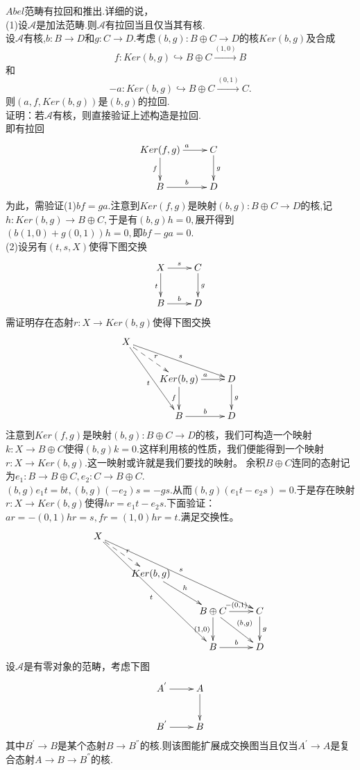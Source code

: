 \documentclass[UTF8]{article}
\begin{document}
$Abel$范畴有拉回和推出.详细的说，\\
(1)设$\mathcal{A}$是加法范畴.则$\mathcal{A}$有拉回当且仅当其有核.\\
设$\mathcal{A}$有核,$b:B\longrightarrow D$和$g:C\longrightarrow D.$考虑$(b,g):B\oplus C\longrightarrow D$的核$Ker(b,g)$及合成
$$
f:Ker(b,g)\hookrightarrow B\oplus C\stackrel{(1,0)}{\longrightarrow}B
$$
和$$
-a:Ker(b,g)\hookrightarrow B\oplus C\stackrel{(0,1)}{\longrightarrow}C.
$$
则$(a,f,Ker(b,g))$是$(b,g)$的拉回.\\
证明：若$\mathcal{A}$有核，则直接验证上述构造是拉回.\\
即有拉回$$
\xymatrix{Ker(f,g)\ar[r]^{a}\ar[d]_{f} &C\ar[d]^{g}\\
	B\ar[r]^{b}&D   }
$$
为此，需验证(1)$bf=ga.$注意到$Ker(f,g)$是映射$(b,g):B\oplus C\longrightarrow D$的核,记$h:Ker(b,g)\longrightarrow B\oplus C,$于是有$(b,g)h=0,$展开得到$(b(1,0)+g(0,1))h=0,$即$bf-ga=0.$\\
(2)设另有$(t,s,X)$使得下图交换
$$
\xymatrix{X\ar[r]^{s}\ar[d]_{t} &C\ar[d]^{g}\\
	B\ar[r]^{b}&D   }
$$
需证明存在态射$r:X\longrightarrow Ker(b,g)$使得下图交换
$$
\xymatrix{X\ar@{-->}[dr]^{r}\ar[rrd]^{s}\ar[ddr]_{t}\\
   &Ker(b,g)\ar[r]^{a}\ar[d]_{f}&D\ar[d]^{g}\\
&B\ar[r]^{b}&D   }
$$
注意到$Ker(f,g)$是映射$(b,g):B\oplus C\longrightarrow D$的核，我们可构造一个映射$k:X\longrightarrow B\oplus C$使得$(b,g)k=0.$这样利用核的性质，我们便能得到一个映射$r:X\longrightarrow Ker(b,g).$这一映射或许就是我们要找的映射。
余积$B\oplus C$连同的态射记为$e_{1}:B\longrightarrow B\oplus C,e_{2}:C\longrightarrow B\oplus C.$\\
$(b,g)e_{1}t=bt,(b,g)(-e_{2})s=-gs.$从而$(b,g)(e_{1}t-e_{2}s)=0.$于是存在映射$r:X\longrightarrow Ker(b,g)$使得$hr=e_{1}t-e_{2}s.$下面验证：$ar=-(0,1)hr=s,fr=(1,0)hr=t.$满足交换性。
$$
\xymatrix{X\ar@{-->}[dr]^{r}\ar[rrrdd]^{s}\ar[dddrr]_{t}\\
	&Ker(b,g)\ar[dr]^{h}\\
	& &B\oplus C\ar[r]^{-(0,1)}\ar[d]_{(1,0)}\ar[rd]^{(b,g)}&C\ar[d]^{g}\\
	& &B\ar[r]^{b}&D   }
$$
设$\mathcal{A}$是有零对象的范畴，考虑下图$$
\xymatrix{
A^{'}\ar[r]&A\ar[d]\\
B^{'}\ar[r]&B
}
$$
其中$B^{'}\longrightarrow B$是某个态射$B\longrightarrow B^{''}$的核.则该图能扩展成交换图当且仅当$A^{'}\longrightarrow A$是复合态射$A\longrightarrow B\longrightarrow B^{''}$的核.\\
\end{document}
